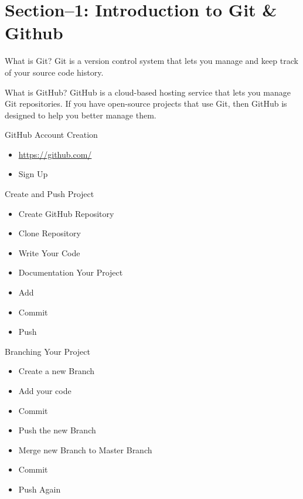 


\maketitle
\section{Section--1: Introduction to Git \& Github}
\begin{frame}[t]{What is Git?}
    Git is a version control system that lets you manage and keep track of your 
    source code history. 
\end{frame}

\begin{frame}[t]{What is GitHub?}
	GitHub is a cloud-based hosting service that lets you manage Git 
	repositories. If you have open-source projects that use Git, then GitHub is 
	designed to help you better manage them.
\end{frame}

\begin{frame}[t]{GitHub Account Creation}
	\begin{itemize}
		\item \url{https://github.com/}
		\item Sign Up
	\end{itemize}
\end{frame}

\begin{frame}[t]{Create and Push Project}
	\begin{itemize}
		\item Create GitHub Repository
		\item Clone Repository 
		\item Write Your Code 
		\item Documentation Your Project 
		\item Add 
		\item Commit 
		\item Push
	\end{itemize}
\end{frame}

\begin{frame}[t]{Branching Your Project}
	\begin{itemize}
		\item Create a new Branch 
		\item Add your code 
		\item Commit  
		\item Push the new Branch 
		\item Merge new Branch to Master Branch 
		\item Commit 
		\item Push Again 
	\end{itemize}
\end{frame}



